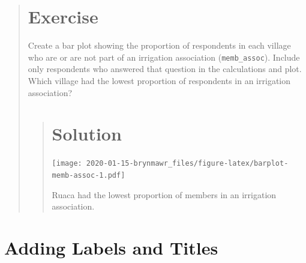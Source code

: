 \documentclass[]{book}
\newenvironment{Shaded}{\begin{snugshade}}{\end{snugshade}}
\newcommand{\KeywordTok}[1]{\textcolor[rgb]{0.13,0.29,0.53}{\textbf{#1}}}
\newcommand{\DataTypeTok}[1]{\textcolor[rgb]{0.13,0.29,0.53}{#1}}
\newcommand{\StringTok}[1]{\textcolor[rgb]{0.31,0.60,0.02}{#1}}
\newcommand{\OperatorTok}[1]{\textcolor[rgb]{0.81,0.36,0.00}{\textbf{#1}}}
\newcommand{\NormalTok}[1]{#1}
\begin{document}
\begin{quote}
\section{Exercise}\label{exercise-13}

Create a bar plot showing the proportion of respondents in each village
who are or are not part of an irrigation association
(\texttt{memb\_assoc}). Include only respondents who answered that
question in the calculations and plot. Which village had the lowest
proportion of respondents in an irrigation association?

\begin{quote}
\section{Solution}\label{solution-17}

\begin{Shaded}
\end{Shaded}

\texttt{[image: 2020-01-15-brynmawr\_files/figure-latex/barplot-memb-assoc-1.pdf]}

Ruaca had the lowest proportion of members in an irrigation association.
\end{quote}
\end{quote}

\section{Adding Labels and Titles}\label{adding-labels-and-titles}
\end{document}
